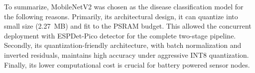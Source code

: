 To summarize, MobileNetV2 was chosen as the disease classification model for the following reasons. Primarily, its architectural design, it can quantize into small size (2.27~MB) and fit to the PSRAM budget. This allowed the concurrent deployment with ESPDet-Pico detector for the complete two-stage pipeline. Secondly, its quantization-friendly architecture, with batch normalization and inverted residuals, maintains high accuracy under aggressive INT8 quantization. Finally, its lower computational cost is crucial for battery powered sensor nodes.
 











